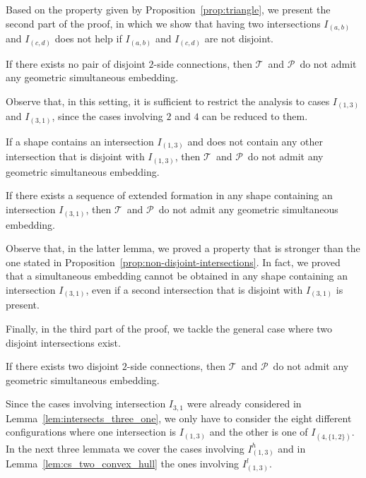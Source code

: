 \documentclass[a4paper,10pt]{llncs}
\newcounter{prop}
\newcommand{\T}{\mbox{$\mathcal T$ }}
\renewcommand{\P}{\mbox{$\mathcal P$ }}
\begin{document}
Based on the property given by Proposition~\ref{prop:triangle}, we present the second part of the proof, in which we show that having two intersections $I_{(a,b)}$ and $I_{(c,d)}$ does not help if $I_{(a,b)}$ and $I_{(c,d)}$ are not disjoint.

\begin{proposition}\label{prop:non-disjoint-intersections}
If there exists no pair of disjoint $2$-side connections, then \T and \P do not admit any geometric simultaneous embedding.
\end{proposition}

Observe that, in this setting, it is sufficient to restrict the analysis to cases $I_{(1,3)}$ and $I_{(3,1)}$, since the cases involving $2$ and $4$ can be reduced to them.

\begin{lemma}\label{lem:intersects_one_three}
If a shape contains an intersection $I_{(1,3)}$ and does not contain any other intersection that is disjoint with $I_{(1,3)}$, then \T and \P do not admit any geometric simultaneous embedding.
\end{lemma}

\begin{lemma}\label{lem:intersects_three_one}
If there exists a sequence of extended formation in any shape containing an intersection $I_{(3,1)}$, then \T and \P do not admit any geometric simultaneous embedding.
\end{lemma}

Observe that, in the latter lemma, we proved a property that is stronger than the one stated in Proposition~\ref{prop:non-disjoint-intersections}. In fact, we proved that a simultaneous embedding cannot be obtained in any shape containing an intersection $I_{(3,1)}$, even if a second intersection that is disjoint with $I_{(3,1)}$ is present.

Finally, in the third part of the proof, we tackle the general case where two disjoint intersections exist.

\begin{proposition}\label{prop:disjoint}
If there exists two disjoint $2$-side connections, then \T and \P do not admit any geometric simultaneous embedding.
\end{proposition}

Since the cases involving intersection $I_{3,1}$ were already considered in Lemma~\ref{lem:intersects_three_one}, we only have to consider the eight different configurations where one intersection is $I_{(1,3)}$ and the other is one of $I_{(4,\{1,2\})}$. In the next three lemmata we cover the cases involving $I_{(1,3)}^h$ and in Lemma~\ref{lem:cs_two_convex_hull} the ones involving $I_{(1,3)}^l$.
\end{document}
